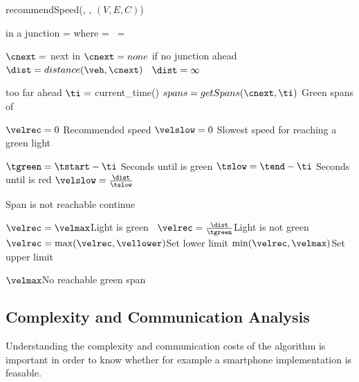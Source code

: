 \begin{algorithm}
\caption{recommendSpeed(\veh, \route, $(V, E, C)$)}\label{alg.recommendedSpeed}
\begin{algorithmic}[1]
 \Comment \veh in a junction\label{alg:recSpeed:injunction}
\State\velmax= \espeed where \eend=\vehposstart
\Else\ \velmax = \vehposspeed
\EndIf\label{alg:recSpeed:injunctionEnd}

\State $\cnext= $ next \con in \route\Comment $\cnext=none$ if no junction ahead \label{alg:recSpeed:cnext}
\ $\dist=distance(\veh,\cnext)$ \label{alg:recSpeed:distance}
\Else\ $\dist = \infty$
\EndIf

 \Return \velmax\Comment \cnext too far ahead
\EndIf
\State $\ti=$ current\_time()
\State $spans = getSpans(\cnext, \ti)$ \Comment Green spans of \cnext \label{alg:recSpeed:getSpan}

\State $\velrec = 0$ \Comment Recommended speed \label{alg:recSpeed:velrec}
\State $\velslow = 0$ \Comment Slowest speed for reaching a green light \label{alg:recSpeed:velslow}

\label{alg:recSpeed:loopSpans}
\State $\tgreen = \tstart - \ti$ \Comment Seconds until \cnextphase is green \label{alg:recSpeed:tg}
\State $\tslow = \tend - \ti$ \Comment Seconds until \cnextphase is red\label{alg:recSpeed:tr}
\State $\velslow = \frac{\dist}{\tslow}$\label{alg:recSpeed:hr}

\State\Comment Span is not reachable
\If{$\velslow > \velmax$} continue\label{alg:recSpeed:continue}
\EndIf

 $\velrec=\velmax$\Comment Light is green\label{alg:recSpeed:green}
\Else\ $\velrec = \frac{\dist}{\tgreen}$\Comment Light is not green\label{alg:recSpeed:h}
\EndIf
\State $\velrec = \max(\velrec, \vellower)$\Comment Set lower limit\label{alg:recSpeed:lowerLimit}
\State\Return $\min(\velrec, \velmax)$\Comment Set upper limit\label{alg:recSpeed:returnh}
\EndFor\label{alg:recSpeed:loopSpansEnd}

\State\Return $\velmax$\Comment No reachable green span\label{alg:recSpeed:returnmax}
\end{algorithmic}
\end{algorithm}

\subsection{Complexity and Communication Analysis}
Understanding the complexity and communication costs of the algorithm is important in order to know whether for example a smartphone implementation is feasable.


